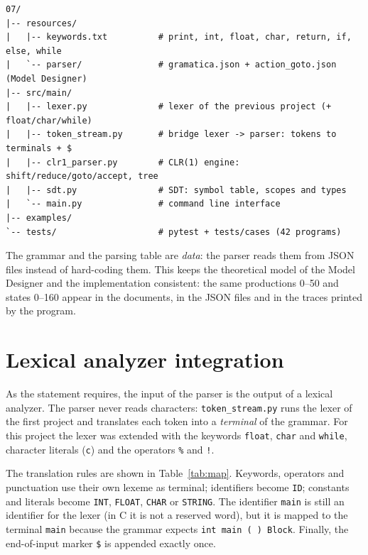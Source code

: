 \documentclass[11pt,letterpaper]{article}
\let\oldsection\section
\renewcommand{\section}{\needspace{8\baselineskip}\oldsection}
\newcommand{\tok}[1]{\texttt{#1}}
\begin{document}
\par\noindent\begin{minipage}{\linewidth}
\begin{lstlisting}
07/
|-- resources/
|   |-- keywords.txt          # print, int, float, char, return, if, else, while
|   `-- parser/               # gramatica.json + action_goto.json (Model Designer)
|-- src/main/
|   |-- lexer.py              # lexer of the previous project (+ float/char/while)
|   |-- token_stream.py       # bridge lexer -> parser: tokens to terminals + $
|   |-- clr1_parser.py        # CLR(1) engine: shift/reduce/goto/accept, tree
|   |-- sdt.py                # SDT: symbol table, scopes and types
|   `-- main.py               # command line interface
|-- examples/
`-- tests/                    # pytest + tests/cases (42 programs)
\end{lstlisting}
\end{minipage}\par


The grammar and the parsing table are \emph{data}: the parser reads them from
JSON files instead of hard-coding them. This keeps the theoretical model of
the Model Designer and the implementation consistent: the same productions
0--50 and states 0--160 appear in the documents, in the JSON files and in the
traces printed by the program.

\section{Lexical analyzer integration}

As the statement requires, the input of the parser is the output of a lexical
analyzer. The parser never reads characters: \texttt{token\_stream.py} runs
the lexer of the first project and translates each token into a
\emph{terminal} of the grammar. For this project the lexer was extended with
the keywords \texttt{float}, \texttt{char} and \texttt{while}, character
literals (\texttt{\textquotesingle{}c\textquotesingle{}}) and the operators \texttt{\%} and \texttt{!}.

The translation rules are shown in Table~\ref{tab:map}. Keywords, operators
and punctuation use their own lexeme as terminal; identifiers become
\tok{ID}; constants and literals become \tok{INT}, \tok{FLOAT}, \tok{CHAR} or
\tok{STRING}. The identifier \texttt{main} is still an identifier for the
lexer (in C it is not a reserved word), but it is mapped to the terminal
\tok{main} because the grammar expects \texttt{int main ( ) Block}. Finally,
the end-of-input marker \tok{\$} is appended exactly once.
\end{document}
